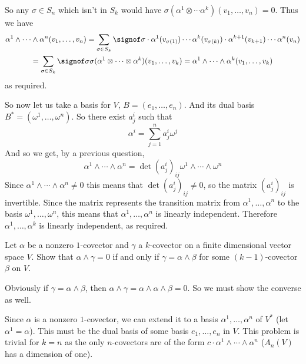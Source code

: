\documentclass[10pt]{article}
\begin{document}
So any $\sigma\in S_n$ which isn't in $S_k$ would have $\sigma(\alpha^1\otimes\cdots\alpha^k)(v_1,\dots,v_n)=0$.
Thus we have
\begin{multline*}
    \alpha^1\wedge\cdots\wedge\alpha^n(v_1,\dots,v_n) = \sum_{\sigma\in S_k}\signof\sigma\cdot\alpha^1(v_{\sigma(1)})\cdots\alpha^k(v_{\sigma(k)})\cdot\alpha^{k+1}(v_{k+1})\cdots\alpha^n(v_n) \\
    = \sum_{\sigma\in S_k}\signof\sigma\sigma(\alpha^1\otimes\cdots\otimes\alpha^k)(v_1,\dots,v_k) = \alpha^1\wedge\cdots\wedge\alpha^k(v_1,\dots,v_k)
\end{multline*}
as required.

So now let us take a basis for $V$, $B=(e_1,\dots,e_n)$.
And its dual basis $B^*=(\omega^1,\dots,\omega^n)$.
So there exist $a^i_j$ such that
\[ \alpha^i = \sum_{j=1}^n a^i_j\omega^j \]
And so we get, by a previous question,
\[ \alpha^1\wedge\cdots\wedge\alpha^n = \det(a^i_j)_{ij}\omega^1\wedge\cdots\wedge\omega^n \]
Since $\alpha^1\wedge\cdots\wedge\alpha^n\neq0$ this means that $\det(a^i_j)_{ij}\neq0$, so the matrix $(a^i_j)_{ij}$ is invertible.
Since the matrix represents the transition matrix from $\alpha^1,\dots,\alpha^n$ to the basis $\omega^1,\dots,\omega^n$, this means that $\alpha^1,\dots,\alpha^n$ is linearly independent.
Therefore $\alpha^1,\dots,\alpha^k$ is linearly independent, as required.

\begin{exercise*}

    Let $\alpha$ be a nonzero $1$-covector and $\gamma$ a $k$-covector on a finite dimensional vector space $V$.
    Show that $\alpha\wedge\gamma=0$ if and only if $\gamma=\alpha\wedge\beta$ for some $(k-1)$-covector $\beta$ on $V$.

\end{exercise*}

Obviously if $\gamma=\alpha\wedge\beta$, then $\alpha\wedge\gamma=\alpha\wedge\alpha\wedge\beta=0$.
So we must show the converse as well.

Since $\alpha$ is a nonzero $1$-covector, we can extend it to a basis $\alpha^1,\dots,\alpha^n$ of $V^*$ (let $\alpha^1=\alpha$).
This must be the dual basis of some basis $e_1,\dots,e_n$ in $V$.
This problem is trivial for $k=n$ as the only $n$-covectors are of the form $c\cdot\alpha^1\wedge\cdots\wedge\alpha^n$ ($A_n(V)$ has a dimension of one).
\end{document}
